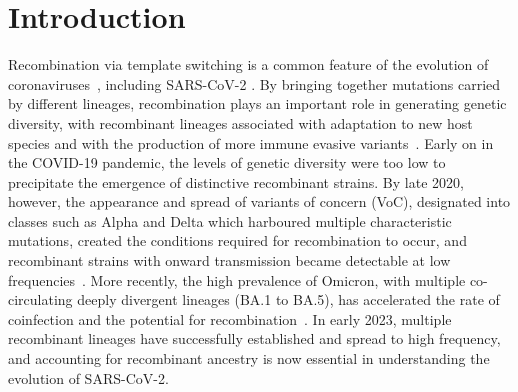 \documentclass{article}
\begin{document}
\section{Introduction}
Recombination via template switching is a common feature
of the evolution of coronaviruses~\citep{Graham2010-xe,De_Klerk2022-tt},
including SARS-CoV-2
\citep{VanInsberghe2021-eu,Jackson2021-ik,Ignatieva2021-rg}. By bringing
together mutations carried by different lineages, recombination plays an
important role in generating genetic diversity, with recombinant lineages
associated with adaptation to new host species and with the production of more
immune evasive variants~\citep{Graham2010-xe,De_Klerk2022-tt}.
Early on in the COVID-19 pandemic, the levels of genetic diversity
were too low to precipitate the emergence of distinctive recombinant strains.
By late 2020, however, the appearance and
spread of variants of concern (VoC), designated into classes such as Alpha and
Delta which harboured multiple characteristic mutations,
created the conditions required for recombination to occur,
and recombinant strains with onward transmission became detectable at
low frequencies~\citep{Jackson2021-ik}.
More recently, the high prevalence of Omicron,
with multiple co-circulating deeply divergent lineages (BA.1 to BA.5), has
accelerated the rate of coinfection and the potential for
recombination~\citep{Bal2022-hq}.
In early 2023, multiple recombinant lineages have successfully
established and spread to high frequency, and accounting for recombinant
ancestry is now essential in understanding the evolution of SARS-CoV-2.
\end{document}
